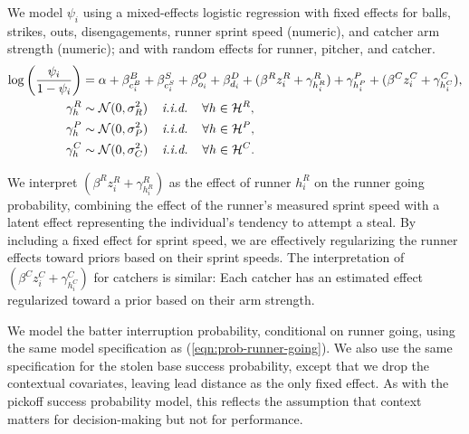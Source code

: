 \documentclass[aoas]{imsart}
\begin{document}
      We model $\psi_i$ using a mixed-effects logistic regression with fixed effects for balls, strikes, outs, disengagements, runner sprint speed (numeric), and catcher arm strength (numeric); and with random effects for runner, pitcher, and catcher.
      \begin{align}
        \label{eqn:prob-runner-going}
        \begin{split}
          \log\left(\frac{\psi_i}{1 - \psi_i}\right) &= \alpha + \beta^B_{c_i^B} + \beta^S_{c_i^S} +
            \beta^O_{o_i} + \beta^D_{d_i} + (\beta^R z_i^R + \gamma^R_{h_i^R}) +
            \gamma^P_{h_i^P} + (\beta^C z_i^C + \gamma^C_{h_i^C}),\\
          \gamma^R_{h} &\sim \mathcal{N}(0, \sigma^2_R) \hspace{4mm} \mbox{\it i.i.d.} \hspace{4mm} \forall h \in \mathcal{H}^R,\\
          \gamma^P_{h} &\sim \mathcal{N}(0, \sigma^2_P) \hspace{4mm} \mbox{\it i.i.d.} \hspace{4mm} \forall h \in \mathcal{H}^P,\\
          \gamma^C_{h} &\sim \mathcal{N}(0, \sigma^2_C) \hspace{4mm} \mbox{\it i.i.d.} \hspace{4mm} \forall h \in \mathcal{H}^C.
        \end{split}
      \end{align}
 
      We interpret $(\beta^R z_i^R + \gamma^R_{h_i^R})$ as the effect of runner $h_i^R$ on the runner going probability, combining the effect of the runner's measured sprint speed with a latent effect representing the individual's tendency to attempt a steal. By including a fixed effect for sprint speed, we are effectively regularizing the runner effects toward priors based on their sprint speeds. The interpretation of $(\beta^C z_i^C + \gamma^C_{h_i^C})$ for catchers is similar: Each catcher has an estimated effect regularized toward a prior based on their arm strength.

      We model the batter interruption probability, conditional on runner going, using the same model specification as (\ref{eqn:prob-runner-going}). We also use the same specification for the stolen base success probability, except that we drop the contextual covariates, leaving lead distance as the only fixed effect. As with the pickoff success probability model, this reflects the assumption that context matters for decision-making but not for performance.
\end{document}
